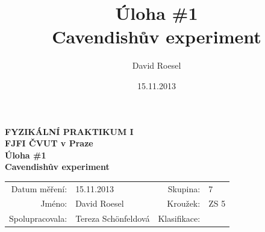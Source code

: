 \documentclass[english]{article}
\newcommand{\Author}{David Roesel}
\newcommand{\Coauthor}{Tereza Schönfeldová}
\newcommand{\Institute}{FJFI ČVUT v Praze}
\newcommand{\Subject}{FYZIKÁLNÍ PRAKTIKUM I}
\newcommand{\Group}{7}
\newcommand{\Circle}{ZS 5}
\newcommand{\Title}{Úloha \#1 \\Cavendishův experiment}
\newcommand{\Date}{15.11.2013}
\begin{document}
\author{\Author}
\title{\Title}
\date{\Date}

\renewcommand{\figurename}{Obr.}
\renewcommand{\tablename}{Tab.}
\renewcommand{\refname}{Reference}


\setlength{\parindent}{0cm}
\begin{multicols}{2}
\textbf{\Subject \\
        \Institute \\[0.1cm]
\Title \\[0.5cm]
}
\begin{tabular}{rlrl}
\large Datum měření: & \Date & \large Skupina: & \Group \\
\large Jméno: & \Author & \large Kroužek:  & \Circle\\
\large Spolupracovala: & \Coauthor &\large Klasifikace:\\
\end{tabular}


\end{multicols}
\end{document}
